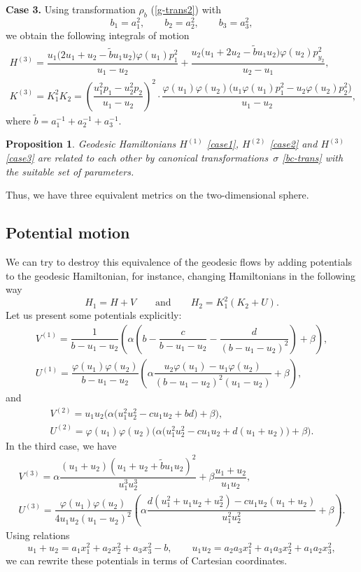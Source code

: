 \documentclass[pdftex]{sigma}
\numberwithin{equation}{section}
\newtheorem{Proposition}[Theorem]{Proposition}
 { \theoremstyle{definition}
\newtheorem{Definition}[Theorem]{Definition}
\newtheorem{Note}[Theorem]{Note}
\newtheorem{Example}[Theorem]{Example}
\newtheorem{Remark}[Theorem]{Remark} }
\begin{document}
\textbf{Case 3.} Using transformation $\rho_b$ (\ref{g-trans2}) with
\[b_1=a_1^2,\qquad b_2=a_2^2,\qquad b_3=a_3^2,\]
 we obtain the following integrals of motion
\begin{gather}
H^{(3)}= \dfrac{u_1\bigl( 2u_1+u_2-\tilde{b}u_1 u_2\bigr)\varphi(u_1)p_1^2}{u_1-u_2}+
\dfrac{u_2\bigl( u_1+2u_2-\tilde{b}u_1u_2 \bigr)\varphi(u_2)p_{y_2}^2}{u_2-u_1},\nonumber\\
K^{(3)}=K_1^2K_2=\left(\dfrac{u_1^2p_{1}-u_2^2p_{2}}{u_1-u_2}\right)^2\cdot
\dfrac{\varphi(u_1)\varphi(u_2)\bigl(u_1\varphi(u_1)p_{1}^2-u_2\varphi(u_2)p_{2}^2\bigr)}{u_1-u_2} , \label{case3}
\end{gather}
where $\tilde{b}=a_1^{-1}+a_2^{-1}+a_3^{-1}$.

\begin{Proposition}
Geodesic Hamiltonians $H^{(1)}$ \eqref{case1}, $H^{(2)}$ \eqref{case2} and $H^{(3)}$ \eqref{case3} are related to each other by canonical transformations~$\sigma$ \eqref{bc-trans} with the suitable set of parameters.
\end{Proposition}
Thus, we have three equivalent metrics on the two-dimensional sphere.

\subsection{Potential motion}
We can try to destroy this equivalence of the geodesic flows by adding potentials to the geodesic Hamiltonian, for instance,
changing Hamiltonians in the following way
\[H_1=H+V\qquad\mbox{and}\qquad H_2=K_1^2(K_2+U) .\]
Let us present some potentials explicitly:
\begin{gather*}
V^{(1)}=\dfrac{1}{b-u_1-u_2} \left( \alpha\left(b-\dfrac{c}{b-u_1-u_2} -\dfrac{d}{(b-u_1-u_2)^2}\right)+\beta\right) ,\\
U^{(1)}=\dfrac{\varphi(u_1)\varphi(u_2)}{b-u_1-u_2} \left(\alpha \dfrac{u_2\varphi(u_1)-u_1\varphi(u_2)}{(b - u_1 - u_2)^2(u_1-u_2)}+\beta\right) ,
\end{gather*}
and
\begin{gather*}
V^{(2)}=u_1u_2\big(\alpha\bigl(u_1^2u_2^2-cu_1u_2+bd\big)+\beta\big) ,\\
U^{(2)}=\varphi(u_1)\varphi(u_2)\big(\alpha\big(u_1^2u_2^2 - cu_1u_2 + d(u_1 + u_2)\big)+\beta\big) .
\end{gather*}
In the third case, we have
\begin{gather*}
V^{(3)}= \alpha \dfrac{(u_1 + u_2)(u_1 +u_2 +\tilde{b} u_1u_2)^2}{u_1^3u_2^3}+\beta \dfrac{ u_1 + u_2}{u_1u_2} ,
\\
U^{(3)}=  \dfrac{\varphi(u_1)\varphi(u_2)}{4u_1u_2(u_1-u_2)^2}
\left(\alpha
\dfrac{d(u_1^2 + u_1u_2 + u_2^2) -c u_1u_2(u_1 + u_2)}{u_1^2u_2^2}
+\beta
\right) .
\end{gather*}
Using relations
\[
u_1+u_2=a_1x_1^2+a_2x_2^2+a_3x_3^2-b ,\qquad u_1u_2=a_2a_3x_1^2+a_1a_3x_2^2+a_1a_2x_3^2,\]
we can rewrite these potentials in terms of Cartesian coordinates.
\end{document}
